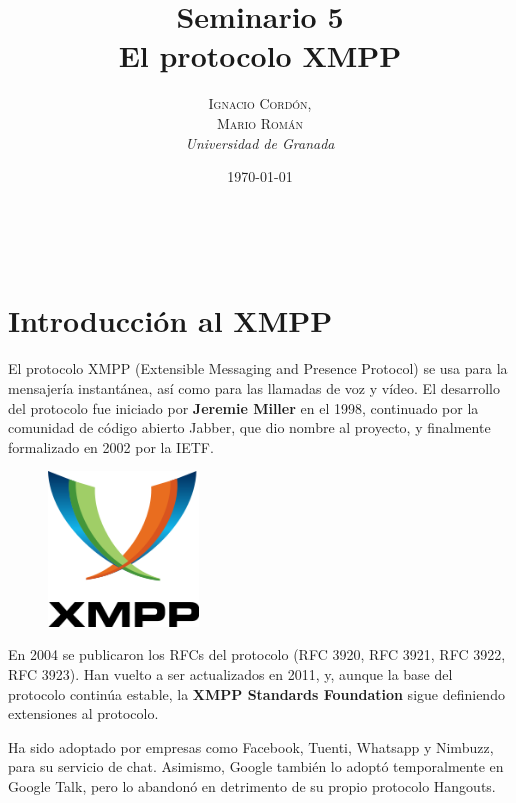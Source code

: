 \documentclass[a4paper, 11pt]{article} %
\title{\textbf{Seminario 5}\\ %
El protocolo XMPP} %
\author{\textsc{Ignacio Cordón,\\Mario Román} %
\\{\textit{Universidad de Granada}}} %
\date{\today} %
\makeatletter
\renewcommand{\maketitle}{ %
  \begin{flushright} %
    {\LARGE\@title} %
    
    \vspace{50pt} %
    
    {\large\@author} %
    \\\@date %
    
    \vspace{40pt} %
  \end{flushright}
}
\makeatother
\begin{document}
\maketitle %



\renewcommand{\abstractname}{Resumen} %
\begin{abstract}
\end{abstract}
{\parskip=2pt
\tableofcontents
}
\pagebreak



\section{Introducción al XMPP}
  El protocolo XMPP (Extensible Messaging and Presence Protocol) se usa para la mensajería
  instantánea, así como para las llamadas de voz y vídeo. El desarrollo del protocolo fue
  iniciado por \textbf{Jeremie Miller} en el 1998, continuado por la comunidad de código abierto Jabber, que dio
  nombre al proyecto, y finalmente formalizado en 2002 por la IETF.\\
  \begin{figure}
  \includegraphics[width=4cm]{logo.png}
  \end{figure}
  En 2004 se publicaron los RFCs del protocolo (RFC 3920, RFC 3921, RFC 3922, RFC 3923). Han vuelto a ser actualizados en 2011, y, aunque
  la base del protocolo continúa estable, la \textbf{XMPP Standards Foundation} sigue definiendo extensiones
  al protocolo.
  
  Ha sido adoptado por empresas como Facebook, Tuenti, Whatsapp y Nimbuzz, para su servicio de chat. Asimismo, Google
  también lo adoptó temporalmente en Google Talk, pero lo abandonó en detrimento de su propio protocolo Hangouts.
\end{document}
